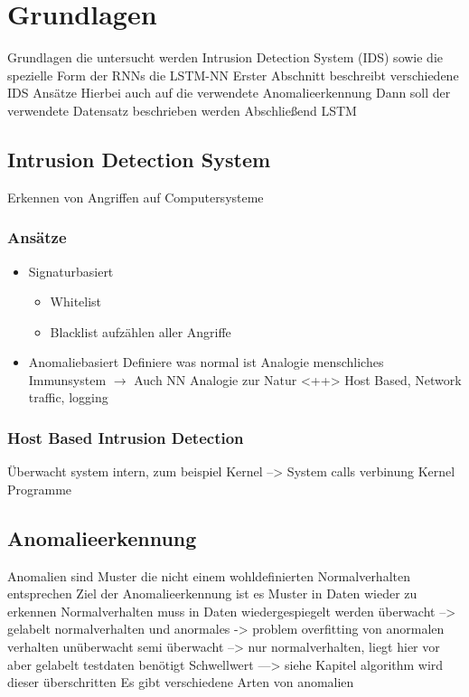 \chapter{Grundlagen}\label{ch:grundlagen}
Grundlagen die untersucht werden Intrusion Detection System (IDS) sowie die spezielle Form der RNNs die LSTM-NN
Erster Abschnitt beschreibt verschiedene IDS Ansätze
Hierbei auch auf die verwendete Anomalieerkennung
Dann soll der verwendete Datensatz beschrieben werden
Abschließend LSTM

    \section{Intrusion Detection System}
        Erkennen von Angriffen auf Computersysteme
        \subsection{Ansätze}
            \begin{itemize}
                \item Signaturbasiert
                    \begin{itemize}
                        \item Whitelist
                        \item Blacklist
                            \subitem aufzählen aller Angriffe
                    \end{itemize}
                \item Anomaliebasiert
                    \subitem Definiere was normal ist
                    \subitem Analogie menschliches Immunsystem
                    $\rightarrow$ Auch NN Analogie zur Natur <++> 
                    Host Based, Network traffic, logging
            \end{itemize}
        \subsection{Host Based Intrusion Detection}
        Überwacht system intern, zum beispiel Kernel --> System calls verbinung Kernel Programme
    \section{Anomalieerkennung}
        Anomalien sind Muster die nicht einem wohldefinierten Normalverhalten entsprechen
        Ziel der Anomalieerkennung ist es Muster in Daten wieder zu erkennen
        Normalverhalten muss in Daten wiedergespiegelt werden
        überwacht --> gelabelt normalverhalten und anormales
        -> problem overfitting von anormalen verhalten
        unüberwacht
        semi überwacht --> nur normalverhalten, liegt hier vor aber gelabelt testdaten
        benötigt Schwellwert --->  siehe Kapitel algorithm
        wird dieser überschritten 
        Es gibt verschiedene Arten von anomalien
